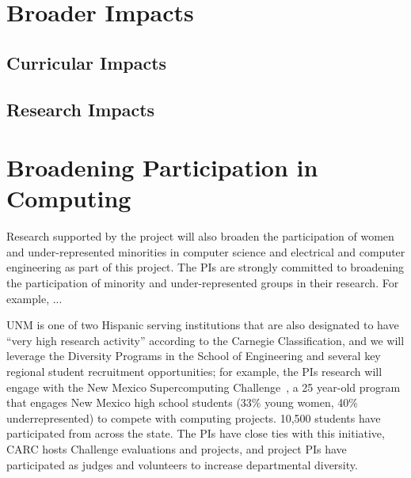 \section{Broader Impacts}

\subsection{Curricular Impacts}
\label{sec:education}

\subsection{Research Impacts} 

\section{Broadening Participation in Computing}
Research supported by the project will also broaden the participation of women and under-represented
minorities in computer science and electrical and computer engineering
as part of this project. The PIs are strongly committed to broadening the
participation of minority and under-represented groups in their research. 
For example, ...

UNM is one of two Hispanic serving institutions that are also designated
to have ``very high research activity''
according to the Carnegie Classification, and we will leverage the Diversity
Programs in the School of Engineering and several key regional student
recruitment opportunities; for example, the PIs research will engage with the New Mexico
Supercomputing Challenge~\cite{NMChallenge}, a 25 year-old program that
engages New Mexico high school students (33\% young women, 40\% underrepresented)
to compete with computing projects.  10,500 students have participated from across the state. The
PIs have close ties with this initiative, CARC hosts Challenge evaluations and projects,
and project PIs have participated as judges and volunteers to increase departmental diversity.
